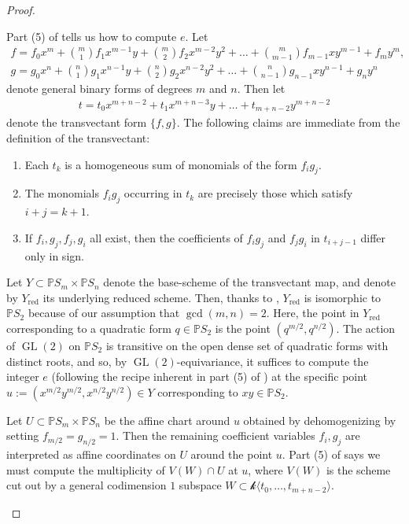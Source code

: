 \documentclass[reqno, 11pt]{amsart}
\theoremstyle{plain}
\theoremstyle{remark}
\renewcommand{\P}{\mathbb{P}}
\renewcommand{\k}{\mathscr{k}}
\DeclareMathOperator{\GL}{GL}
\DeclareMathOperator{\red}{red}
\begin{document}
\begin{proof}
\begin{enumerate}
        Part (5) of  tells us how to compute $e$.  Let 
        \begin{align*}
        f = f_{0}x^{m} + {m \choose 1} f_{1}x^{m-1}y + {m \choose 2} f_{2}x^{m-2}y^{2} + \dots + {m \choose m-1} f_{m-1}xy^{m-1} + f_{m}y^{m},\\
        g = g_{0}x^{n} + {n \choose 1} g_{1}x^{n-1}y + {n \choose 2} g_{2}x^{n-2}y^{2} + \dots + {n \choose n-1} g_{n-1}xy^{n-1} + g_{n}y^{n}
        \end{align*}
        denote general binary forms of degrees $m$ and $n$.   Then let 
        \begin{align*}
            t = t_0 x^{m+n-2} + t_{1}x^{m+n-3}y + \dots + t_{m+n-2}y^{m+n-2}
        \end{align*}
        denote the transvectant form $\{f,g\}$. The following claims are immediate from the definition of the transvectant: 
        \begin{enumerate}
            \item Each $t_{k}$ is a homogeneous sum of monomials of the form $f_{i}g_{j}$.
            \item The monomials $f_{i}g_{j}$ occurring in $t_{k}$ are precisely those which satisfy $i+j = k+1$.
            \item If $f_{i}, g_{j}, f_{j}, g_{i}$ all exist, then the coefficients of $f_{i}g_{j}$ and $f_{j}g_{i}$ in $t_{i+j-1}$ differ only in sign.
        \end{enumerate}
    
        Let $Y \subset \P S_{m} \times \P S_{n}$ denote the base-scheme of the transvectant map, and denote by $Y_{\red}$ its underlying reduced scheme. Then, thanks to , $Y_{\red}$ is isomorphic to $\P S_{2}$ because of our assumption that $\gcd(m,n) = 2$.  Here, the point in $Y_{\red}$ corresponding to a quadratic form $q \in \P S_{2}$ is the point $(q^{m/2}, q^{n/2})$.  The action of $\GL(2)$ on $\P S_{2}$ is transitive on the open dense set of quadratic forms with distinct roots, and so, by $\GL(2)$-equivariance, it suffices to compute the integer $e$ (following the recipe inherent in part (5) of ) at the specific point $u := (x^{m/2}y^{m/2}, x^{n/2}y^{n/2}) \in Y$ corresponding to $xy \in \P S_{2}$. 
    
        Let $U \subset \P S_{m} \times \P S_{n}$ be the affine chart around $u$ obtained by dehomogenizing by setting $f_{m/2} = g_{n/2} = 1$. Then the remaining coefficient variables $f_i, g_j$ are interpreted as affine coordinates on $U$ around the point $u$. Part (5) of  says we must compute the multiplicity of $V(W) \cap U$ at $u$, where $V(W)$ is the scheme cut out by a general codimension $1$ subspace $W \subset \k \langle t_0, \dots, t_{m+n-2} \rangle$. 
    

\end{enumerate}
\end{proof}
\end{document}
